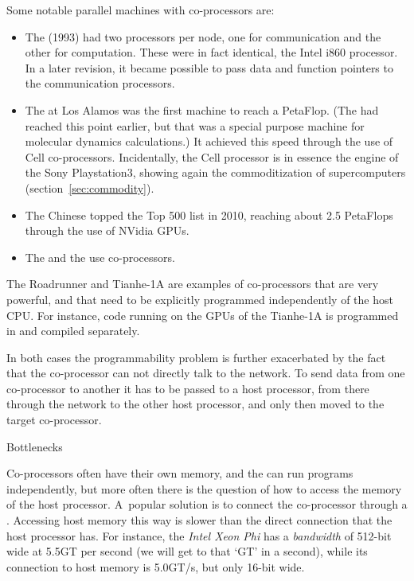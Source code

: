 Some notable parallel machines with co-processors are:
\begin{itemize}
\item The  (1993) had two processors per
  node, one for communication and the other for computation. These
  were in fact identical, the Intel i860
  processor. In a later revision, it became possible to pass data and
  function pointers to the communication processors.
\item The  at Los Alamos was the first
  machine to reach a PetaFlop.
  (The 
  had reached this point earlier, but that was a special purpose
  machine for molecular dynamics calculations.)
  It achieved this
  speed through the use of Cell
  co-processors. Incidentally, the Cell processor is in essence the
  engine of the Sony Playstation3, showing again the commoditization
  of supercomputers (section~\ref{sec:commodity}).
\item The Chinese  topped the Top 500 list in
  2010, reaching about 2.5 PetaFlops through the use of
  NVidia \acp{GPU}.
\item The  and the 
  use  co-processors.
\end{itemize}
The Roadrunner and Tianhe-1A are examples of co-processors that are
very powerful, and that need to be explicitly programmed independently
of the host CPU. For instance, code running on the \acp{GPU} of the
Tianhe-1A is programmed in  and compiled separately.

In both cases the programmability problem is further exacerbated by
the fact that the co-processor can not directly talk to the network.
To send data from one co-processor to another it has to be passed to a
host processor, from there through the network to the other host
processor, and only then moved to the target co-processor.


 {Bottlenecks}

Co-processors often have their own memory, and the
 can run programs independently, but
more often there is the question of how to access the memory of the
host processor. A~popular solution is to connect the co-processor
through a . Accessing host memory this way is
slower than the direct connection that the host processor has. For
instance, the \emph{Intel Xeon Phi} has a
\emph{bandwidth} of 512-bit wide at
5.5GT per second (we will get to that `GT' in a second), while its
connection to host memory is 5.0GT/s, but only 16-bit wide.

